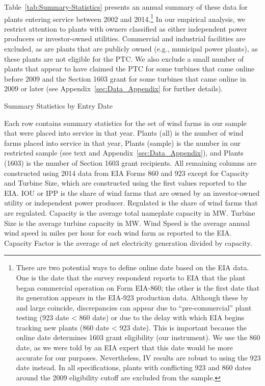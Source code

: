 \documentclass[12pt]{article}
\begin{document}
Table~\ref{tab:Summary-Statistics} presents an annual summary of these data for plants entering service between 2002 and 2014.\footnote{There are two potential ways to define online date based on the EIA data. One is the date that the survey respondent reports to EIA that the plant began commercial operation on Form EIA-860; the other is the first date that its generation appears in the EIA-923 production data. Although these by and large coincide, discrepancies can appear due to ``pre-commercial'' plant testing (923 date \textless{} 860 date) or due to the delay with which EIA begins tracking new plants (860 date \textless{} 923 date). This is important because the online date determines 1603 grant eligibility (our instrument). We use the 860 date, as we were told by an EIA expert that this date would be more accurate for our purposes. Nevertheless, IV results are robust to using the 923 date instead. In all specifications, plants with conflicting 923 and 860 dates around the 2009 eligibility cutoff are excluded from the sample.} In our empirical analysis, we restrict attention to plants with owners classified as either independent power producers or investor-owned utilities. Commercial and industrial facilities are excluded, as are plants that are publicly owned (e.g., municipal power plants), as these plants are not eligible for the PTC. We also exclude a small number of plants that appear to have claimed the PTC for some turbines that came online before 2009 and the Section 1603 grant for some turbines that came online in 2009 or later (see Appendix~\ref{sec:Data_Appendix} for further details).

\begin{table}[H]
\caption{Summary Statistics by Entry Date \label{tab:Summary-Statistics}}
\vspace{-17pt}

\footnotesize

Each row contains summary statistics for the set of wind farms in our sample that were placed into service in that year. Plants (all) is the number of wind farms placed into service in that year, Plants (sample) is the number in our restricted sample (see text and Appendix~\ref{sec:Data_Appendix}), and Plants (1603) is the number of Section 1603 grant recipients. All remaining columns are constructed using 2014 data from EIA Forms 860 and 923 except for Capacity and Turbine Size, which are constructed using the first values reported to the EIA. IOU or IPP is the share of wind farms that are owned by an investor-owned utility or independent power producer. Regulated is the share of wind farms that are regulated. Capacity is the average total nameplate capacity in MW. Turbine Size is the average turbine capacity in MW. Wind Speed is the average annual wind speed in miles per hour for each wind farm as reported to the EIA. Capacity Factor is the average of net electricity generation divided by capacity.
\end{table}
\end{document}
